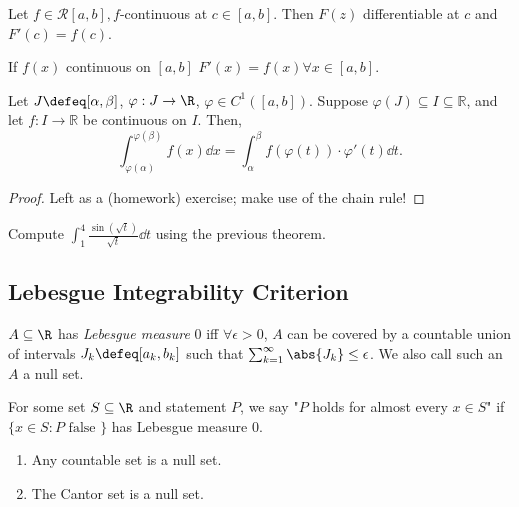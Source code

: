 \begin{theorem}
    Let $f \in \mathcal{R}[a, b], f$-continuous at $c \in [a, b]$. Then $F(z)$ differentiable at $c$ and $F'(c) = f(c)$.
\end{theorem}
\begin{corollary}
    If $f(x)$ continuous on $[a, b]$ $F'(x) = f(x) \forall x \in [a, b]$.
\end{corollary}

\begin{theorem}
Let $J \defeq [\alpha, \beta]$, $\varphi : J \to \R$, $\varphi \in C^1([a, b])$. Suppose $\varphi(J) \subseteq I \subseteq \mathbb{R}$, and let $f : I \to \mathbb{R}$ be continuous on $I$. Then, \[
\int_{\varphi(\alpha)}^{\varphi(\beta)}    f(x) \dd{x} = \int_\alpha^\beta f(\varphi(t))\cdot \varphi'(t) \dd{t}.
\]
\end{theorem}
\begin{proof}
    Left as a (homework) exercise; make use of the chain rule!
\end{proof}

\begin{example}
    Compute $\int_1^4 \frac{\sin(\sqrt{t})}{\sqrt{t}} \dd{t}$ using the previous theorem.
\end{example}

\subsection{Lebesgue Integrability Criterion}

\begin{definition}
    $A \subseteq \R$ has \emph{Lebesgue measure} 0 iff $\forall \epsilon > 0$, $A$ can be covered by a countable union of intervals $J_k \defeq [a_k, b_k]$ such that $\sum_{k=1}^\infty\abs{J_k} \leq \epsilon$. We also call such an $A$ a null set.

    For some set $S \subseteq \R$ and statement $P$, we say "$P$ holds for almost every $x \in S$" if $\{x \in S : P \text{ false }\}$ has Lebesgue measure 0.
\end{definition}

\begin{example}
    \begin{enumerate}
        \item Any countable set is a null set.
        \item The Cantor set is a null set.
    \end{enumerate}
\end{example}

